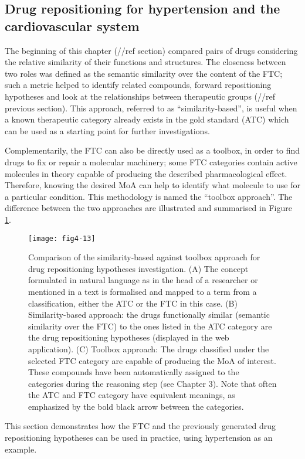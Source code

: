\subsection{Drug repositioning for hypertension and the cardiovascular system}
The beginning of this chapter (//ref section) compared pairs of drugs considering the relative similarity of their functions and structures. The closeness between two roles was defined as the semantic similarity over the content of the FTC; such a metric helped to identify related compounds, forward repositioning hypotheses and look at the relationships between therapeutic groups (//ref previous section). This approach, referred to as “similarity-based”, is useful when a known therapeutic category already exists in the gold standard (ATC) which can be used as a starting point for further investigations.

Complementarily, the FTC can also be directly used as a toolbox, in order to find drugs to fix or repair a molecular machinery; some FTC categories contain active molecules in theory capable of producing the described pharmacological effect. Therefore, knowing the desired MoA can help to identify what molecule to use for a particular condition. This methodology is named the “toolbox approach”. The difference between the two approaches are illustrated and summarised in Figure \ref{fig4-13}.

\begin{figure}[ht]
    \centering
    \texttt{[image: fig4-13]}
    \caption{Comparison of the similarity-based against toolbox approach for drug repositioning hypotheses investigation. (A) The concept formulated in natural language as in the head of a researcher or mentioned in a text is formalised and mapped to a term from a classification, either the ATC or the FTC in this case. (B) Similarity-based approach: the drugs functionally similar (semantic similarity over the FTC) to the ones listed in the ATC category are the drug repositioning hypotheses (displayed in the web application). (C) Toolbox approach: The drugs classified under the selected FTC category are capable of producing the MoA of interest. These compounds have been automatically assigned to the categories during the reasoning step (see Chapter 3). Note that often the ATC and FTC category have equivalent meanings, as emphasized by the bold black arrow between the categories.}
    \label{fig4-13}
\end{figure}

This section demonstrates how the FTC and the previously generated drug repositioning hypotheses can be used in practice, using hypertension as an example.

